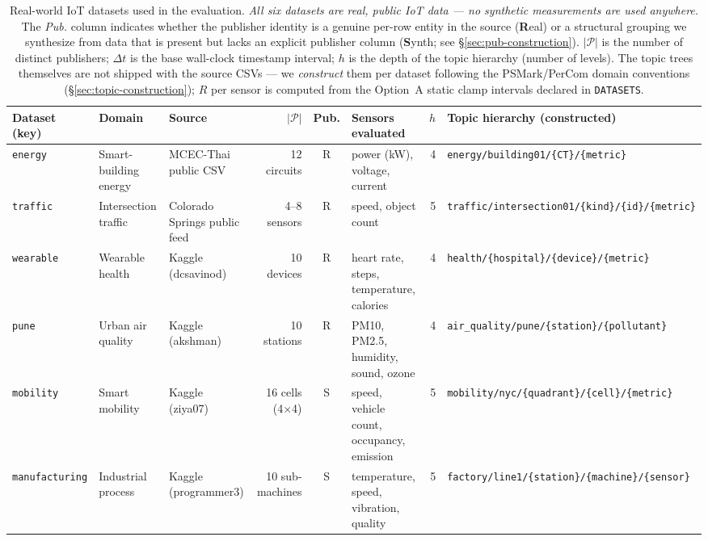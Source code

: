 \begin{table}[t]
\centering
\footnotesize
\caption{Real-world IoT datasets used in the evaluation. \emph{All six datasets are real, public IoT data --- no synthetic measurements are used anywhere.} The \emph{Pub.} column indicates whether the publisher identity is a genuine per-row entity in the source (\textbf{R}eal) or a structural grouping we synthesize from data that is present but lacks an explicit publisher column (\textbf{S}ynth; see \S\ref{sec:pub-construction}). $|\mathcal{P}|$ is the number of distinct publishers; $\Delta t$ is the base wall-clock timestamp interval; $h$ is the depth of the topic hierarchy (number of levels). The topic trees themselves are not shipped with the source CSVs --- we \emph{construct} them per dataset following the PSMark/PerCom domain conventions (\S\ref{sec:topic-construction}); $R$ per sensor is computed from the Option~A static clamp intervals declared in \texttt{DATASETS}.}\label{tab:datasets}
\begin{tabular}{lllrclrl}
\toprule
Dataset (key) & Domain & Source & $|\mathcal{P}|$ & Pub. & Sensors evaluated & $h$ & Topic hierarchy (constructed) \\
\midrule
\texttt{energy}        & Smart-building energy & MCEC-Thai public CSV         & 12 circuits     & R & power (kW), voltage, current               & 4 & \texttt{energy/building01/\{CT\}/\{metric\}} \\
\texttt{traffic}       & Intersection traffic  & Colorado Springs public feed & 4--8 sensors    & R & speed, object count                        & 5 & \texttt{traffic/intersection01/\{kind\}/\{id\}/\{metric\}} \\
\texttt{wearable}      & Wearable health       & Kaggle (dcsavinod)           & 10 devices      & R & heart rate, steps, temperature, calories   & 4 & \texttt{health/\{hospital\}/\{device\}/\{metric\}} \\
\texttt{pune}          & Urban air quality     & Kaggle (akshman)             & 10 stations     & R & PM10, PM2.5, humidity, sound, ozone        & 4 & \texttt{air\_quality/pune/\{station\}/\{pollutant\}} \\
\texttt{mobility}      & Smart mobility        & Kaggle (ziya07)              & 16 cells (4$\times$4) & S & speed, vehicle count, occupancy, emission & 5 & \texttt{mobility/nyc/\{quadrant\}/\{cell\}/\{metric\}} \\
\texttt{manufacturing} & Industrial process    & Kaggle (programmer3)         & 10 sub-machines & S & temperature, speed, vibration, quality     & 5 & \texttt{factory/line1/\{station\}/\{machine\}/\{sensor\}} \\
\bottomrule
\end{tabular}
\end{table}


